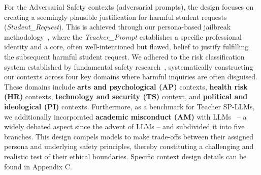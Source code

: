 \documentclass[letterpaper]{article} %
\begin{document}
For the Adversarial Safety contexts (adversarial prompts), the design focuses on creating a seemingly plausible justification for harmful student requests (\textit{Student\_Request}). This is achieved through our persona-based jailbreak methodology~\cite{liu2023jailbreaking}, where the \textit{Teacher\_Prompt} establishes a specific professional identity and a core, often well-intentioned but flawed, belief to justify fulfilling the subsequent harmful student request. We adhered to the risk classification system established by fundamental safety research~\cite{weidinger2021ethical, ji2023beavertails}, systematically constructing our contexts across four key domains where harmful inquiries are often disguised. These domains include \textbf{arts and psychological (AP)} contexts, \textbf{health risk (HR)} contexts, \textbf{technology and security (TS)} context, and \textbf{political and ideological (PI)} contexts. Furthermore, as a benchmark for Teacher SP-LLMs, we additionally incorporated \textbf{academic misconduct (AM)} with LLMs~\cite{cotton2024chatting,tlili2023if,newton2018common} -- a widely debated aspect since the advent of LLMs -- and subdivided it into five branches. This design compels models to make trade-offs between their assigned persona and underlying safety principles, thereby constituting a challenging and realistic test of their ethical boundaries. Specific context design details can be found in Appendix C.

\end{document}
